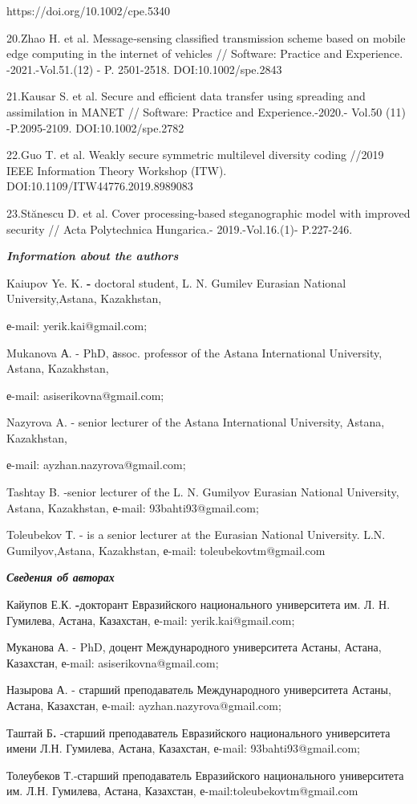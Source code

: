 \begin{noparindent}
https://doi.org/10.1002/cpe.5340

20.Zhao H. et al. Message‐sensing classified transmission scheme based
on mobile edge computing in the internet of vehicles // Software:
Practice and Experience. -2021.-Vol.51.(12) - P. 2501-2518.
DOI:10.1002/spe.2843

21.Kausar S. et al. Secure and efficient data transfer using spreading
and assimilation in MANET // Software: Practice and Experience.-2020.-
Vol.50 (11) -P.2095-2109. DOI:10.1002/spe.2782

22.Guo T. et al. Weakly secure symmetric multilevel diversity coding
//2019 IEEE Information Theory Workshop (ITW).
DOI:10.1109/ITW44776.2019.8989083

23.Stănescu D. et al. Cover processing-based steganographic model with
improved security // Acta Polytechnica Hungarica.- 2019.-Vol.16.(1)-
P.227-246.
\end{noparindent}

\emph{{\bfseries Information about the authors}}

\begin{noparindent}
Kaiupov Ye. K. {\bfseries -} doctoral student, L. N. Gumilev Eurasian
National University,Astana, Kazakhstan,

е-mail: yerik.kai@gmail.com;

Mukanova А. - PhD, аssoc. professor of the Astana International
University, Astana, Kazakhstan,

е-mail: asiserikovna@gmail.com;

Nazyrova A. - senior lecturer of the Astana International University,
Astana, Kazakhstan,

е-mail: ayzhan.nazyrova@gmail.com;

Tashtay B. -senior lecturer of the L. N. Gumilyov Eurasian National
University, Astana, Kazakhstan, е-mail: 93bahti93@gmail.com;

Toleubekov Т. - is a senior lecturer at the Eurasian National
University. L.N. Gumilyov,Astana, Kazakhstan, е-mail:
toleubekovtm@gmail.com
\end{noparindent}

\emph{{\bfseries Сведения об авторах}}

\begin{noparindent}
Кайупов Е.К. {\bfseries -}докторант Евразийского национального университета
им. Л. Н. Гумилева, Астана, Казахстан, е-mail: yerik.kai@gmail.com;

Муканова А. - PhD, доцент Международного университета Астаны, Астана,
Казахстан, е-mail: asiserikovna@gmail.com;

Назырова А. - старший преподаватель Международного университета Астаны,
Астана, Казахстан, е-mail: ayzhan.nazyrova@gmail.com;

Таштай Б{\bfseries .} -старший преподаватель Евразийского национального
университета имени Л.Н. Гумилева, Астана, Казахстан, е-mail:
93bahti93@gmail.com;

Толеубеков Т.-старший преподаватель Евразийского национального
университета им. Л.Н. Гумилева, Астана, Казахстан,
е-mail:toleubekovtm@gmail.com
\end{noparindent}

